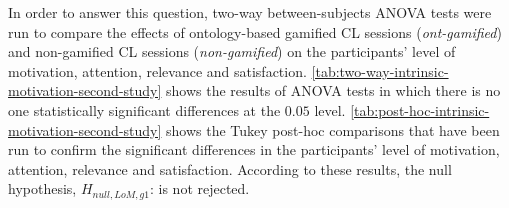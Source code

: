 In order to answer this question, two-way between-subjects ANOVA tests were run to compare the effects of ontology-based gamified CL sessions (\emph{ont-gamified}) and non-gamified CL sessions (\emph{non-gamified}) on the participants' level of motivation, attention, relevance and satisfaction. \autoref{tab:two-way-intrinsic-motivation-second-study} shows the results of ANOVA tests in which there is no one statistically significant differences at the $0.05$ level.
\autoref{tab:post-hoc-intrinsic-motivation-second-study} shows the Tukey post-hoc comparisons that have been run to confirm the significant differences in the participants' level of motivation, attention, relevance and satisfaction. According to these results, 
the null hypothesis, $H_{null,LoM,g1}$:  is not rejected.

